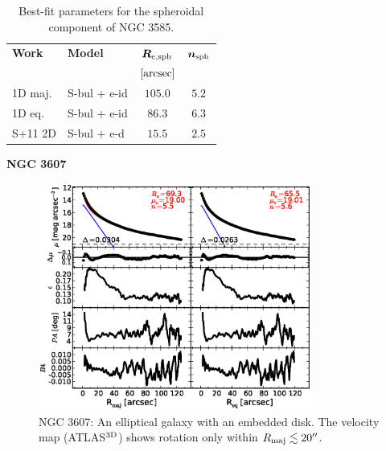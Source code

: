\documentclass[preprint2]{emulateapj}
\newcommand{\fitfigurewidth}{0.8\textwidth}
\begin{document}
  \begin{table}[h]
  \small
  \caption{Best-fit parameters for the spheroidal component of NGC 3585.}
  \begin{center}
  \begin{tabular}{llcc}
  \hline
  {\bf Work} & {\bf Model}   & $\bm R_{\rm e,sph}$    & $\bm n_{\rm sph}$ \\
    &  &  $[\rm arcsec]$ & \\
  \hline
  1D maj. & S-bul + e-id & $105.0$  &  $5.2$ \\
  1D eq.  & S-bul + e-id & $86.3$  &  $6.3$ \\
  \hline
  S+11 2D         & S-bul + e-d      & $15.5$   &  $2.5$ \\
  \hline
  \end{tabular}
  \end{center}
  \label{tab:n3585}
  \end{table}


  \clearpage\newpage\noindent

  {\bf NGC 3607 \\}

  \begin{figure}[h]
  \begin{center}
  \includegraphics[width=\fitfigurewidth]{n3607_1Dfit.eps}
  \caption{NGC 3607: 
  An elliptical galaxy with an embedded disk. 
  The velocity map (ATLAS$^{\rm 3D}$) shows rotation only within $R_{\rm maj} \lesssim 20''$. 
   }
  \end{center}
  \end{figure}
  
\end{document}
